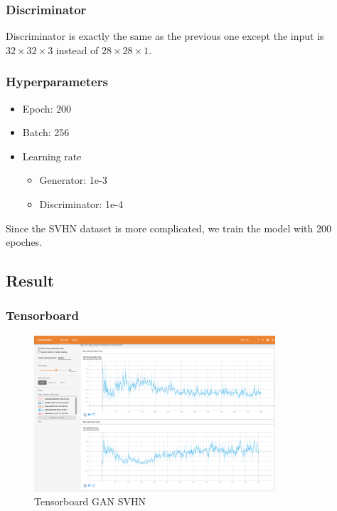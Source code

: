 \documentclass{article}
\begin{document}
\subsubsection{Discriminator}

Discriminator is exactly the same as the previous one except the input is $32\times 32\times 3$ instead of $28\times 28\times 1$.

\subsubsection{Hyperparameters}

\begin{itemize}
  \item Epoch: 200
  \item Batch: 256
  \item Learning rate
    \begin{itemize}
      \item Generator: 1e-3
      \item Discriminator: 1e-4
    \end{itemize}
\end{itemize}

Since the SVHN dataset is more complicated, we train the model with 200 epoches.

\subsection{Result}

\subsubsection{Tensorboard}

\begin{figure}[!htb]
  \centering
  \includegraphics[width=0.8\textwidth]{imgs/tensorboard-GAN-SVHN.png}
  \caption{Tensorboard GAN SVHN}
  \label{fig_TB_GAN_SVHN}
\end{figure}
\end{document}
